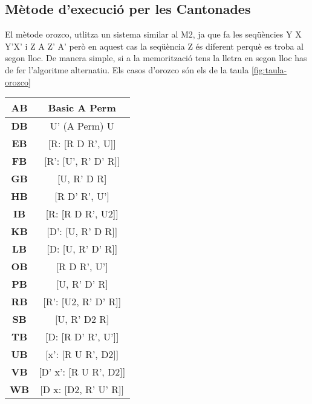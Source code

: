 \subsection{Mètode d'execució per les Cantonades}

El mètode orozco, utlitza un sistema similar al M2, ja que fa les seqüències Y X Y'X' i Z A Z' A' però en aquest cas la seqüència Z és diferent perquè es troba al segon lloc. De manera simple, si a la memorització tens la lletra en segon lloc has de fer l'algoritme alternatiu.
Els casos d'orozco són els de la taula \ref{fig:taula-orozco}

\begin{table}[!h]
    \begin{minipage}{.5\linewidth}
        \centering
        \begin{tabular}{|c|c|} 
            \hline
            \textbf{AB} & Basic A Perm \\
            \hline
            \textbf{DB} & U' (A Perm) U \\
            \hline
            \textbf{EB} & [R: [R D R', U]] \\
            \hline
            \textbf{FB} & [R': [U', R' D' R]] \\
            \hline
            \textbf{GB} & [U, R' D R] \\
            \hline
            \textbf{HB} & [R D' R', U'] \\
            \hline
            \textbf{IB} & [R: [R D R', U2]] \\
            \hline
            \textbf{KB} & [D': [U, R' D R]] \\
            \hline
            \textbf{LB} & [D: [U, R' D' R]] \\
            \hline
            \textbf{OB} & [R D R', U'] \\
            \hline
            \textbf{PB} & [U, R' D' R] \\
            \hline
            \textbf{RB} & [R': [U2, R' D' R]] \\
            \hline
            \textbf{SB} & [U, R' D2 R] \\
            \hline
            \textbf{TB} & [D: [R D' R', U']] \\
            \hline
            \textbf{UB} & [x': [R U R', D2]] \\
            \hline
            \textbf{VB} & [D' x': [R U R', D2]] \\
            \hline
            \textbf{WB} & [D x: [D2, R' U' R]] \\

\end{tabular}
\end{minipage}
\end{table}
